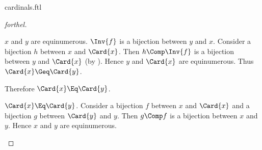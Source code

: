\documentclass{stex}
\begin{document}
\begin{smodule}{cardinals.ftl}
\begin{proof}[forthel]
\begin{case}{$x$ and $y$ are equinumerous.}
    $\Inv{f}$ is a bijection between $y$ and $x$.
    Consider a bijection $h$ between $x$ and $\Card{x}$.
    Then $h \Comp \Inv{f}$ is a bijection between $y$ and $\Card{x}$ (by ).
    Hence $y$ and $\Card{x}$ are equinumerous.
    Thus $\Card{x} \Geq \Card{y}$.

    Therefore $\Card{x} \Eq \Card{y}$.
  \end{case}

  \begin{case}{$\Card{x} \Eq \Card{y}$.}
    Consider a bijection $f$ between $x$ and $\Card{x}$ and a bijection $g$
    between $\Card{y}$ and $y$.
    Then $g \Comp f$ is a bijection between $x$ and $y$.
    Hence $x$ and $y$ are equinumerous.
  \end{case}
\end{proof}

\end{smodule}
\end{document}

